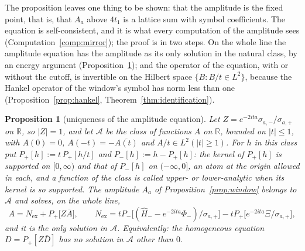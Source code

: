 \documentclass[11pt]{article}
\newtheorem{proposition}[theorem]{Proposition}
\theoremstyle{definition}
\theoremstyle{remark}
\newcommand{\R}{\mathbb{R}}
\begin{document}
The proposition leaves one thing to be shown: that the amplitude is the fixed point, that is, that $A_a$ above $4t_1$ is a lattice sum with symbol coefficients. The equation is self-consistent, and it is what every computation of the amplitude sees (Computation~\ref{comp:mirror}); the proof is in two steps. On the whole line the amplitude equation has the amplitude as its only solution in the natural class, by an energy argument (Proposition~\ref{prop:identification}); and the operator of the equation, with or without the cutoff, is invertible on the Hilbert space $\{B:B/t\in L^2\}$, because the Hankel operator of the window's symbol has norm less than one (Proposition~\ref{prop:hankel}, Theorem~\ref{thm:identification}).

\begin{proposition}[uniqueness of the amplitude equation]\label{prop:identification}
Let $Z=e^{-2ita}\sigma_{a,-}/\sigma_{a,+}$ on $\R$, so $|Z|=1$, and let $\mathcal A$ be the class of functions $A$ on $\R$, bounded on $|t|\le1$, with $A(0)=0$, $A(-t)=-\overline{A(t)}$ and $A/t\in L^2(|t|\ge1)$. For $h$ in this class put $P_+[h]:=t\,P_+[h/t]$ and $P_-[h]:=h-P_+[h]$: the kernel of $P_+[h]$ is supported on $[0,\infty)$ and that of $P_-[h]$ on $(-\infty,0]$, an atom at the origin allowed in each, and a function of the class is called upper- or lower-analytic when its kernel is so supported. The amplitude $A_a$ of Proposition~\ref{prop:window} belongs to $\mathcal A$ and solves, on the whole line,
\[
A=N_{\mathrm{ex}}+P_+\big[Z\overline A\big],\qquad N_{\mathrm{ex}}=tP_-\big[(\hat H_--e^{-2ita}\Phi_-)/\sigma_{a,+}\big]-tP_+\big[e^{-2ita}\Xi/\sigma_{a,+}\big],
\]
and it is the only solution in $\mathcal A$. Equivalently: the homogeneous equation $D=P_+[Z\overline D]$ has no solution in $\mathcal A$ other than $0$.
\end{proposition}
\end{document}
